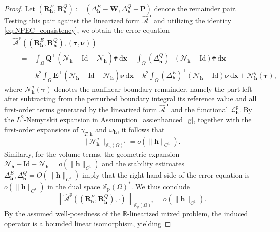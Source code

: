 \documentclass[12pt,reqno]{amsart}
\theoremstyle{definition}
\numberwithin{equation}{section}
\begin{document}
\begin{proof}
Let $(\mathbf{R}_{\mathbf{h}}^E, \mathbf{R}_{\mathbf{h}}^Q) := (\Delta_{\mathbf{h}}^E - \mathbf{W}, \Delta_{\mathbf{h}}^Q - \mathbf{P})$ denote the remainder pair. Testing this pair against the linearized form $\widehat{\mathcal{A}}^{\mathrm{p}}$ and utilizing the identity \eqref{eq:NPEC_consistency}, we obtain the error equation
\[
\begin{aligned}
&\widehat{\mathcal{A}}^{\mathrm{p}}((\mathbf{R}_{\mathbf{h}}^E, \mathbf{R}_{\mathbf{h}}^Q), (\boldsymbol{\tau}, \boldsymbol{\nu})) \\
&\quad = -\int_\Omega \mathbf{Q}^\top (\mathcal{N}_{\mathbf{h}} - \mathrm{Id} - \dot{\mathcal{N}}_{\mathbf{h}}) \overline{\boldsymbol{\tau}} \,\mathrm{d}\boldsymbol{x} - \int_\Omega (\Delta_{\mathbf{h}}^Q)^\top (\mathcal{N}_{\mathbf{h}} - \mathrm{Id}) \overline{\boldsymbol{\tau}} \,\mathrm{d}\boldsymbol{x} \\
&\quad \quad + k^2 \int_\Omega \mathbf{E}^\top (\mathcal{N}_{\mathbf{h}} - \mathrm{Id} - \dot{\mathcal{N}}_{\mathbf{h}}) \overline{\boldsymbol{\nu}} \,\mathrm{d}\boldsymbol{x} + k^2 \int_\Omega (\Delta_{\mathbf{h}}^E)^\top (\mathcal{N}_{\mathbf{h}} - \mathrm{Id}) \overline{\boldsymbol{\nu}} \,\mathrm{d}\boldsymbol{x} + \mathcal{N}_{\mathbf{h}}^g(\boldsymbol{\tau}),
\end{aligned}
\]
where \(\mathcal N_{\mathbf h}^{g}(\boldsymbol{\tau})\) denotes the nonlinear
boundary remainder, namely the part left after subtracting from the perturbed
boundary integral its reference value and all first-order terms generated by
the linearized form \(\widehat{\mathcal A}^{\mathrm p}\) and the functional
\(\mathcal L_{\mathbf h}^{\mathrm p}\). By the \(L^2\)-Nemytskii expansion in
Assumption~\eqref{ass:enhanced_g}, together with the first-order expansions of
\(\gamma_{T,\mathbf h}\) and \(\omega_{\mathbf h}\), it follows that
\[
\|\mathcal N_{\mathbf h}^{g}\|_{\mathbb X_{\mathrm p}(\Omega)^*}
=
o(\|\mathbf h\|_{C^1}).
\]
Similarly, for the volume terms, the geometric expansion $\mathcal{N}_{\mathbf{h}} - \mathrm{Id} - \dot{\mathcal{N}}_{\mathbf{h}} = o(\|\mathbf{h}\|_{C^1})$ and the stability estimates $\Delta_{\mathbf{h}}^E, \Delta_{\mathbf{h}}^Q = O(\|\mathbf{h}\|_{C^1})$ imply that the right-hand side of the error equation is $o(\|\mathbf{h}\|_{C^1})$ in the dual space $\mathbb{X}_{\mathrm{p}}(\Omega)^*$. We thus conclude
\[
\left\| \widehat{\mathcal{A}}^{\mathrm{p}}((\mathbf{R}_{\mathbf{h}}^E, \mathbf{R}_{\mathbf{h}}^Q), \cdot) \right\|_{\mathbb{X}_{\mathrm{p}}(\Omega)^*} = o(\|\mathbf{h}\|_{C^1}).
\]
By the assumed well-posedness of the $\mathbb{R}$-linearized mixed problem, the induced operator is a bounded linear isomorphism, yielding

\end{proof}
\end{document}
